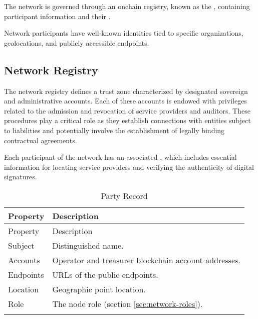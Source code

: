 \documentclass{oc}
\begin{document}
The network is governed through an onchain registry, known as the , containing participant information and their .

Network participants have well-known identities tied to specific organizations, geolocations, and publicly accessible endpoints.

\subsection{Network Registry}\label{sec:network-registry}

The network registry defines a trust zone characterized by designated sovereign and administrative accounts. Each of these accounts is endowed with privileges related to the admission and revocation of service providers and auditors.
These procedures play a critical role as they establish connections with entities subject to liabilities and potentially involve the establishment of legally binding contractual agreements.

Each participant of the network has an associated , which includes essential information for locating service providers and verifying the authenticity of digital signatures.

\begin{xltabular}{\linewidth}{ l  X }
  \caption{Party Record} 
  \label{table:party-record}\\
  \toprule
   Property & Description  \\
  \midrule
  \endfirsthead
   Property & Description  \\
  \midrule
  \endhead
  \bottomrule
  \endfoot
  
  Subject &  Distinguished name\cite{x510}. \\ \addlinespace

  Accounts & Operator and treasurer blockchain account addresses. \\ \addlinespace
    
  Endpoints & URLs\cite{rfc3986} of the public endpoints. \\  \addlinespace
  
  Location & Geographic point location\cite{iso6709}. \\  \addlinespace
    
  Role & The node role (section \ref{sec:network-roles}). \\ \addlinespace
  
\end{xltabular}
\end{document}
